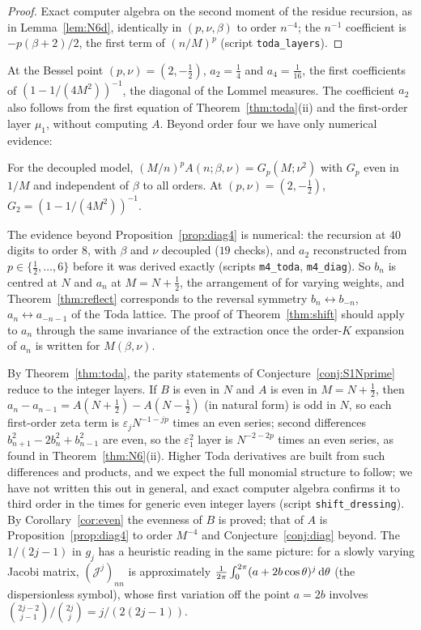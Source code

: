 \begin{proof}
Exact computer algebra on the second moment of the residue recursion, as in Lemma~\ref{lem:N6d}, identically in $(p,\nu,\beta)$ to order
$n^{-4}$; the $n^{-1}$ coefficient is $-p(\beta+2)/2$, the first term of $(n/M)^p$ (script \texttt{toda\_layers}).
\end{proof}

At the Bessel point $(p,\nu)=(2,-\frac12)$, $a_2=\frac14$ and $a_4=\frac1{16}$, the first coefficients of $(1-1/(4M^2))^{-1}$, the
diagonal of the Lommel measures. The coefficient $a_2$ also follows from the first equation of Theorem~\ref{thm:toda}(ii) and the
first-order layer $\mu_1$, without computing $A$. Beyond order four we have only numerical evidence:

\begin{conjecture}\label{conj:diag}
For the decoupled model, $(M/n)^pA(n;\beta,\nu)=G_p(M;\nu^2)$ with $G_p$ even in $1/M$ and independent of $\beta$ to all orders.
At $(p,\nu)=(2,-\frac12)$, $G_2=(1-1/(4M^2))^{-1}$.
\end{conjecture}

The evidence beyond Proposition~\ref{prop:diag4} is numerical: the recursion at $40$ digits to order $8$, with $\beta$ and $\nu$
decoupled ($19$ checks), and $a_2$ reconstructed from $p\in\{\frac12,\dots,6\}$ before it was derived exactly (scripts \texttt{m4\_toda},
\texttt{m4\_diag}). So $b_n$ is centred at $N$ and $a_n$ at $M=N+\frac12$, the arrangement of
\cite[Theorem~5.2]{BleherIts} for varying weights, and Theorem~\ref{thm:reflect} corresponds to the reversal symmetry
$b_n\leftrightarrow b_{-n}$, $a_n\leftrightarrow a_{-n-1}$ of the Toda lattice. The proof of Theorem~\ref{thm:shift} should apply to
$a_n$ through the same invariance of the extraction once the order-$K$ expansion of $a_n$ is written for $M(\beta,\nu)$.

\begin{remark}\label{rem:parity}
By Theorem~\ref{thm:toda}, the parity statements of Conjecture~\ref{conj:S1Nprime} reduce to the integer layers. If $B$ is
even in $N$ and $A$ is even in $M=N+\frac12$, then $a_n-a_{n-1}=A(N+\frac12)-A(N-\frac12)$ (in natural form) is odd in $N$, so each
first-order zeta term is $\varepsilon_jN^{-1-jp}$ times an even series; second differences $b_{n+1}^2-2b_n^2+b_{n-1}^2$ are even, so the
$\varepsilon_1^2$ layer is $N^{-2-2p}$ times an even series, as found in Theorem~\ref{thm:N6}(ii). Higher Toda derivatives are built
from such differences and products, and we expect the full monomial structure to follow; we have not written this out in general,
and exact computer algebra confirms it to third order in the times for generic even integer layers (script \texttt{shift\_dressing}). By
Corollary~\ref{cor:even} the evenness of $B$ is proved; that of $A$ is Proposition~\ref{prop:diag4} to order $M^{-4}$ and
Conjecture~\ref{conj:diag} beyond. The $1/(2j-1)$ in $g_j$ has a
heuristic reading in the same picture: for a slowly varying Jacobi matrix, $(\mathcal J^j)_{nn}$ is approximately
$\frac1{2\pi}\int_0^{2\pi}(a+2b\cos\theta)^j\,\mathrm{d}\theta$ (the dispersionless symbol), whose first variation off the point $a=2b$ involves
$\binom{2j-2}{j-1}/\binom{2j}j=j/(2(2j-1))$.
\end{remark}
